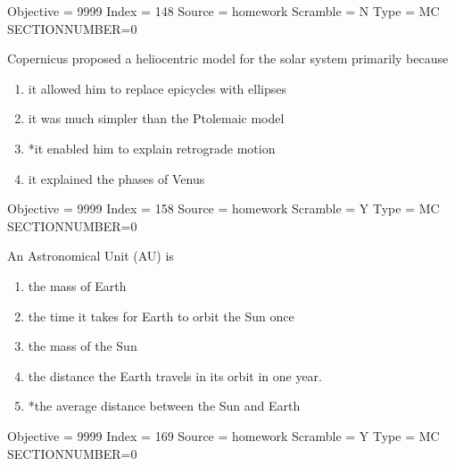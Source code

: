 \documentclass[11pt]{article}
\begin{document}
\begin{enumerate}
\begin{minipage}{\textwidth}
\begin{minipage}{\textwidth}
Objective = 9999
Index = 148
Source = homework
Scramble = N
Type = MC
SECTIONNUMBER=0
\end{minipage}
\end{minipage}
\vskip 0.20in

\begin{minipage}{\textwidth}
\begin{minipage}{\textwidth}
\item Copernicus proposed a heliocentric model for the solar system primarily because \underline{\hspace{0.5in}}
\begin{enumerate} 
\setlength{\itemsep}{1pt} 
\setlength{\parskip}{0pt} 
\setlength{\parsep}{0pt}
\setlength{\multicolsep}{1pt} 
\item it allowed him to replace epicycles with ellipses
\item it was much simpler than the Ptolemaic model
\item *it enabled him to explain retrograde motion
\item it explained the phases of Venus
\end{enumerate} 
Objective = 9999
Index = 158
Source = homework
Scramble = Y
Type = MC
SECTIONNUMBER=0
\end{minipage}
\end{minipage}
\vskip 0.20in

\begin{minipage}{\textwidth}
\begin{minipage}{\textwidth}
\item An Astronomical Unit (AU) is \underline{\hspace{0.5in}}
\begin{enumerate} 
\setlength{\itemsep}{1pt} 
\setlength{\parskip}{0pt} 
\setlength{\parsep}{0pt}
\setlength{\multicolsep}{1pt} 
\item the mass of Earth
\item the time it takes for Earth to orbit the Sun once
\item the mass of the Sun
\item the distance the Earth travels in its orbit in one year.
\item *the average distance between the Sun and Earth
\end{enumerate} 
Objective = 9999
Index = 169
Source = homework
Scramble = Y
Type = MC
SECTIONNUMBER=0
\end{minipage}
\end{minipage}
\vskip 0.20in


\end{enumerate}
\end{document}
